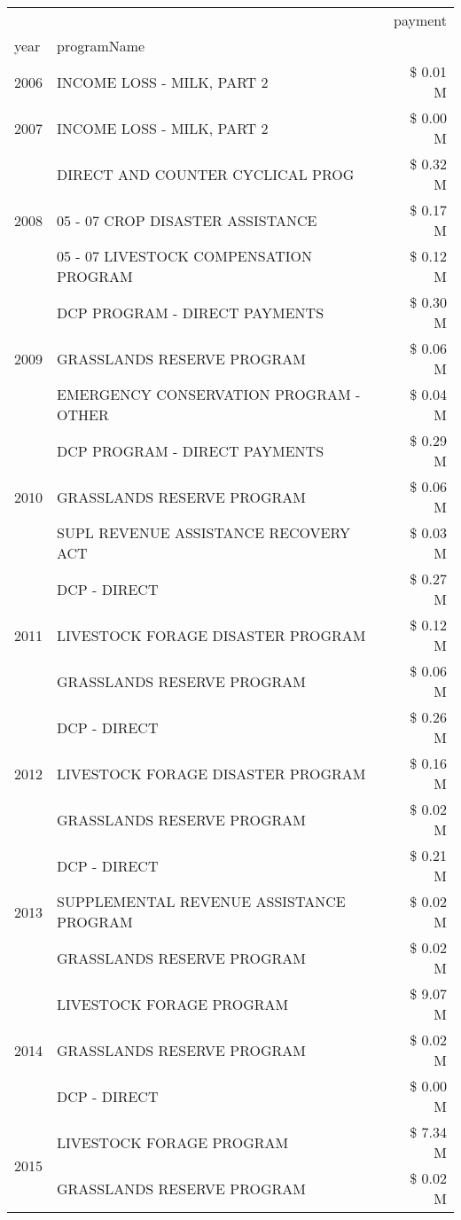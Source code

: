\begin{tabular}{llr}
\toprule
 &  & payment \\
year & programName &  \\
\midrule
2006 & INCOME LOSS - MILK, PART 2 & \$ 0.01 M \\
\cline{1-3}
2007 & INCOME LOSS - MILK, PART 2 & \$ 0.00 M \\
\cline{1-3}
\multirow[t]{3}{*}{2008} & DIRECT AND COUNTER CYCLICAL PROG & \$ 0.32 M \\
 & 05 - 07 CROP DISASTER ASSISTANCE & \$ 0.17 M \\
 & 05 - 07 LIVESTOCK COMPENSATION PROGRAM & \$ 0.12 M \\
\cline{1-3}
\multirow[t]{3}{*}{2009} & DCP PROGRAM - DIRECT PAYMENTS & \$ 0.30 M \\
 & GRASSLANDS RESERVE PROGRAM & \$ 0.06 M \\
 & EMERGENCY CONSERVATION PROGRAM - OTHER & \$ 0.04 M \\
\cline{1-3}
\multirow[t]{3}{*}{2010} & DCP PROGRAM - DIRECT PAYMENTS & \$ 0.29 M \\
 & GRASSLANDS RESERVE PROGRAM & \$ 0.06 M \\
 & SUPL REVENUE ASSISTANCE RECOVERY ACT & \$ 0.03 M \\
\cline{1-3}
\multirow[t]{3}{*}{2011} & DCP - DIRECT & \$ 0.27 M \\
 & LIVESTOCK FORAGE DISASTER PROGRAM & \$ 0.12 M \\
 & GRASSLANDS RESERVE PROGRAM & \$ 0.06 M \\
\cline{1-3}
\multirow[t]{3}{*}{2012} & DCP - DIRECT & \$ 0.26 M \\
 & LIVESTOCK FORAGE DISASTER PROGRAM & \$ 0.16 M \\
 & GRASSLANDS RESERVE PROGRAM & \$ 0.02 M \\
\cline{1-3}
\multirow[t]{3}{*}{2013} & DCP - DIRECT & \$ 0.21 M \\
 & SUPPLEMENTAL REVENUE ASSISTANCE PROGRAM & \$ 0.02 M \\
 & GRASSLANDS RESERVE PROGRAM & \$ 0.02 M \\
\cline{1-3}
\multirow[t]{3}{*}{2014} & LIVESTOCK FORAGE PROGRAM & \$ 9.07 M \\
 & GRASSLANDS RESERVE PROGRAM & \$ 0.02 M \\
 & DCP - DIRECT & \$ 0.00 M \\
\cline{1-3}
\multirow[t]{3}{*}{2015} & LIVESTOCK FORAGE PROGRAM & \$ 7.34 M \\
 & GRASSLANDS RESERVE PROGRAM & \$ 0.02 M \\

\end{tabular}
